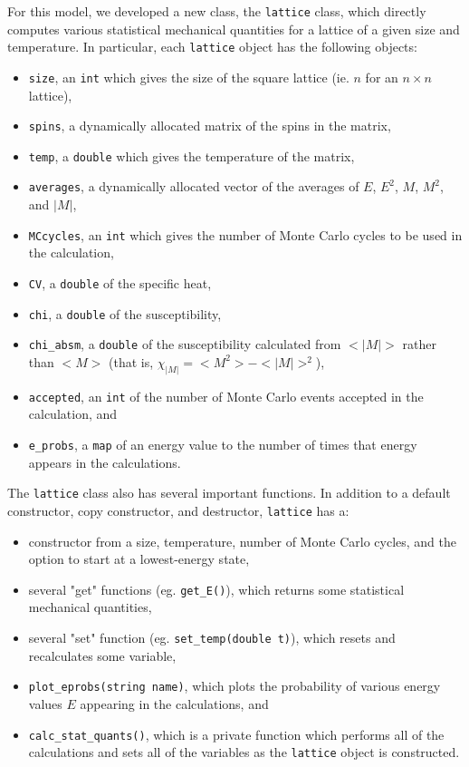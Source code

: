 \documentclass[12pt]{article}
\numberwithin{equation}{section}
\begin{document}
For this model, we developed a new class, the \texttt{lattice} class, which directly computes various statistical mechanical quantities for a lattice of a given size and temperature.  In particular, each \texttt{lattice} object has the following objects:
\begin{itemize}
\item \texttt{size}, an \texttt{int} which gives the size of the square lattice (ie. $n$ for an $n\times n$ lattice),
\item \texttt{spins}, a dynamically allocated matrix of the spins in the matrix,
\item \texttt{temp}, a \texttt{double} which gives the temperature of the matrix,
\item \texttt{averages}, a dynamically allocated vector of the averages of $E$, $E^{2}$, $M$, $M^{2}$, and $|M|$,
\item \texttt{MCcycles}, an \texttt{int} which gives the number of Monte Carlo cycles to be used in the calculation,
\item \texttt{CV}, a \texttt{double} of the specific heat,
\item \texttt{chi}, a \texttt{double} of the susceptibility,
\item \texttt{chi\_absm}, a \texttt{double} of the susceptibility calculated from $<|M|>$ rather than $<M>$ (that is, $\chi_{|M|}=<M^{2}>-<|M|>^{2}$),
\item \texttt{accepted}, an \texttt{int} of the number of Monte Carlo events accepted in the calculation, and
\item \texttt{e\_probs}, a \texttt{map} of an energy value to the number of times that energy appears in the calculations.
\end{itemize}
\par The \texttt{lattice} class also has several important functions.  In addition to a default constructor, copy constructor, and  destructor, \texttt{lattice} has a:
\begin{itemize}
\item constructor from a size, temperature, number of Monte Carlo cycles, and the option to start at a lowest-energy state,
\item several "get" functions (eg. \texttt{get\_{E}()}), which returns some statistical mechanical quantities,
\item several "set" function (eg. \texttt{set\_temp(double t)}), which resets and recalculates some variable,
\item \texttt{plot\_eprobs(string name)}, which plots the probability of various energy values $E$ appearing in the calculations, and
\item \texttt{calc\_stat\_quants()}, which is a private function which performs all of the calculations and sets all of the variables as the \texttt{lattice} object is constructed.
\end{itemize} 
\end{document}
